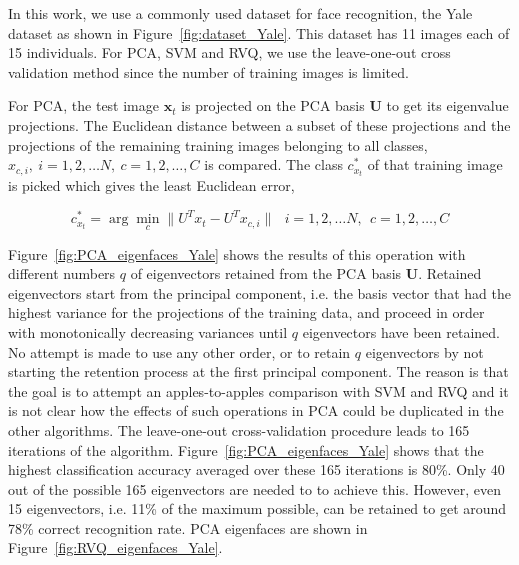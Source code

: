 In this work, we use a commonly used dataset for face recognition, the Yale dataset as shown in Figure~\ref{fig:dataset_Yale}.  This dataset has 11 images each of 15 individuals.  For PCA, SVM and RVQ, we use the leave-one-out cross validation method since the number of training images is limited.  

For PCA, the test image $\mathbf{x}_t$ is projected on the PCA basis $\mathbf{U}$ to get its eigenvalue projections.  The Euclidean distance between a subset of these projections and the projections of the remaining training images belonging to all classes, $x_{c,i}, \  i=1, 2, \ldots N, \ c=1, 2, \ldots, C$ is compared.  The class $c^*_{x_t}$ of that training image is picked which gives the least Euclidean error,


\begin{equation}
c^*_{x_t} = \arg\min_c\|U^Tx_t - U^Tx_{c,i}\| \ \ \  i=1, 2, \ldots N, \ \ c=1, 2, \ldots, C
\end{equation}

Figure~\ref{fig:PCA_eigenfaces_Yale} shows the results of this operation with different numbers $q$ of eigenvectors retained from the PCA basis $\mathbf{U}$.  Retained eigenvectors start from the principal component, i.e. the basis vector that had the highest variance for the projections of the training data, and proceed in order with monotonically decreasing variances until $q$ eigenvectors have been retained.  No attempt is made to use any other order, or to retain $q$ eigenvectors by not starting the retention process at the first principal component.  The reason is that the goal is to attempt an apples-to-apples comparison with SVM and RVQ and it is not clear how the effects of such operations in PCA could be duplicated in the other algorithms.  The leave-one-out cross-validation procedure leads to 165 iterations of the algorithm.  Figure~\ref{fig:PCA_eigenfaces_Yale} shows that the highest classification accuracy averaged over these 165 iterations is 80\%.  Only 40 out of the possible 165 eigenvectors are needed to to achieve this.  However, even 15 eigenvectors, i.e. 11\% of the maximum possible, can be retained to get around 78\% correct recognition rate.  PCA eigenfaces are shown in Figure~\ref{fig:RVQ_eigenfaces_Yale}.

